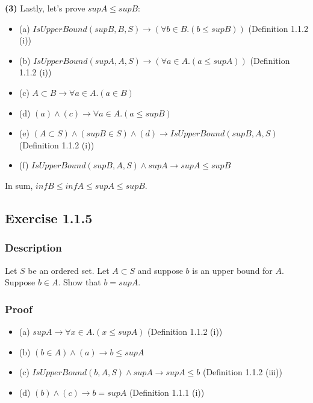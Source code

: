 \documentclass[12pt, letterpaper, oneside]{book}
\begin{document}
\textbf{(3)} Lastly, let's prove $sup A \le sup B$:
\begin{itemize}
  \item (a) $IsUpperBound(sup B, B, S) \rightarrow (\forall b \in B. (b \le sup B))$ (Definition 1.1.2 (i))
  \item (b) $IsUpperBound(sup A, A, S) \rightarrow (\forall a \in A. (a \le sup A))$ (Definition 1.1.2 (i))
  \item (c) $A \subset B \rightarrow \forall a \in A. (a \in B)$
  \item (d) $(a) \land (c) \rightarrow \forall a \in A. (a \le sup B)$
  \item (e) $(A \subset S) \land (sup B \in S) \land (d) \rightarrow IsUpperBound(sup B, A, S)$ (Definition 1.1.2 (i))
  \item (f) $IsUpperBound(sup B, A, S) \land sup A \rightarrow sup A \le sup B$
\end{itemize}

In sum, $inf B \le inf A \le sup A \le sup B$.

\subsection{Exercise 1.1.5}

\subsubsection{Description}

Let $S$ be an ordered set. Let $A \subset S$ and suppose $b$ is an upper bound for $A$. Suppose $b \in A$. Show that
$b = sup A$.

\subsubsection{Proof}

\begin{itemize}
  \item (a) $sup A \rightarrow \forall x \in A. (x \le sup A)$ (Definition 1.1.2 (i))
  \item (b) $(b \in A) \land (a) \rightarrow b \le sup A$
  \item (c) $IsUpperBound(b, A, S) \land sup A \rightarrow sup A \le b$ (Definition 1.1.2 (iii))
  \item (d) $(b) \land (c) \rightarrow b = sup A$ (Definition 1.1.1 (i))
\end{itemize}
\end{document}
